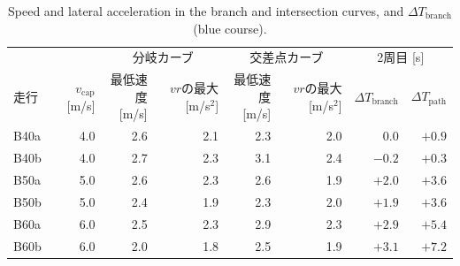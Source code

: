 \begin{table}[!htbp]
  \centering
  \caption{Speed and lateral acceleration in the branch and intersection curves, and $\Delta T_{\mathrm{branch}}$ (blue course).}
  \label{tab:branch}
  \footnotesize
  \begin{lrbox}{\tblbox}\setlength{\tabcolsep}{3pt}\begin{tabular}{lrrrrrrr}
    \toprule
    & & \multicolumn{2}{c}{分岐カーブ} & \multicolumn{2}{c}{交差点カーブ} & \multicolumn{2}{c}{2周目 [s]} \\
    \cmidrule(lr){3-4}\cmidrule(lr){5-6}\cmidrule(lr){7-8}
    走行 & \shortstack[r]{$v_{\mathrm{cap}}$\\{[m/s]}} & \shortstack[r]{最低速度\\{[m/s]}} & \shortstack[r]{$vr$の最大\\{[m/s$^2$]}} & \shortstack[r]{最低速度\\{[m/s]}} & \shortstack[r]{$vr$の最大\\{[m/s$^2$]}} & $\Delta T_{\mathrm{branch}}$ & $\Delta T_{\mathrm{path}}$ \\
    \midrule
    B40a & 4.0 & 2.6 & 2.1 & 2.3 & 2.0 & 0.0 & $+0.9$ \\
    B40b & 4.0 & 2.7 & 2.3 & 3.1 & 2.4 & $-0.2$ & $+0.3$ \\
    B50a & 5.0 & 2.6 & 2.3 & 2.6 & 1.9 & $+2.0$ & $+3.6$ \\
    B50b & 5.0 & 2.4 & 1.9 & 2.3 & 2.0 & $+1.9$ & $+3.6$ \\
    B60a & 6.0 & 2.5 & 2.3 & 2.9 & 2.3 & $+2.9$ & $+5.4$ \\
    B60b & 6.0 & 2.0 & 1.8 & 2.5 & 1.9 & $+3.1$ & $+7.2$ \\
    \bottomrule
  \end{tabular}\end{lrbox}\usebox{\tblbox}
\end{table}

